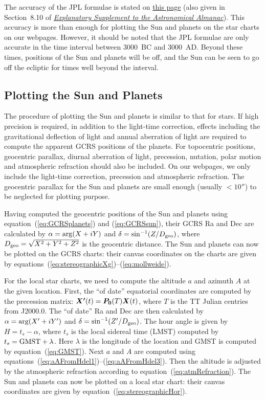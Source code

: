 \documentclass[12pt]{article}
\newcommand{\ve}[1]{\mbox{\boldmath $#1$}}
\newcommand{\expl}{\href{http://www.uscibooks.com/urban.htm}{\it Explanatory Supplement to the Astronomical Almanac}}
\begin{document}
The accuracy of the JPL formulae is stated on 
\href{https://ssd.jpl.nasa.gov/?planet_pos}{this page} (also given in Section~8.10 
of \expl). This accuracy is more than enough for plotting the Sun and planets 
on the star charts 
on our webpages. However, it should be noted that 
the JPL formulae are only accurate in the time interval between 3000~BC and 
3000~AD. Beyond these times, positions of the Sun and planets will be off, and 
the Sun can be seen to go off the ecliptic for times well beyond the interval.

\subsection{Plotting the Sun and Planets}

The procedure of plotting the Sun and planets is similar to that for 
stars. If high precision is required, in addition to the light-time correction,
effects including the gravitational deflection of light 
and annual aberration of light are required to compute the apparent GCRS 
positions of the planets. For topocentric positions, geocentric parallax, 
diurnal aberration of light, precession, nutation, polar motion and 
atmospheric refraction should also be included. On our webpages, we only include 
the light-time correction, precession and atmospheric refraction. The geocentric 
parallax for the Sun and planets are small enough (usually $< 10''$) to be 
neglected for plotting purpose.

Having computed the geocentric positions of the Sun and planets using 
equation~(\ref{eq:GCRSplanets}) and (\ref{eq:GCRSsun}), their GCRS Ra and 
Dec are calculated by $\alpha={\rm arg}(X+iY)$ and $\delta=\sin^{-1}(Z/D_{\rm geo})$, 
where $D_{\rm geo}=\sqrt{X^2+Y^2+Z^2}$ is the geocentric distance. The Sun 
and planets can now be plotted on the GCRS charts: their canvas coordinates on the
charts are given by equations~(\ref{eq:stereographicXg})--(\ref{eq:mollweide}). 

For the local star charts, we need to compute the altitude $a$
and azimuth $A$ at the given location. First, the ``of date'' equatorial
coordinates are computed by the precession matrix: $\ve{X'}(t)=\ve{P_0}(T)\ve{X}(t)$,
where $T$ is the TT Julian centries from J2000.0. The ``of date'' Ra and Dec
are then calculated by $\alpha = {\rm arg}(X'+iY')$ and $\delta=\sin^{-1} (Z'/D_{\rm geo})$.
The hour angle is given by $H=t_s-\alpha$, where $t_s$ is the local
sidereal time (LMST) computed by $t_s = {\rm GMST}+\lambda$.
Here $\lambda$ is the longitude of the location and GMST is computed
by equation~(\ref{eq:GMST}). Next $a$ and $A$ are computed using
equations~(\ref{eq:aAFromHdel1})--(\ref{eq:aAFromHdel3}). Then the altitude
is adjusted by the atmospheric refraction according to equation~(\ref{eq:atmRefraction}).
The Sun and planets can now be plotted on a local star chart: their canvas coordinates are
given by equation~(\ref{eq:stereographicHor}).
\end{document}
